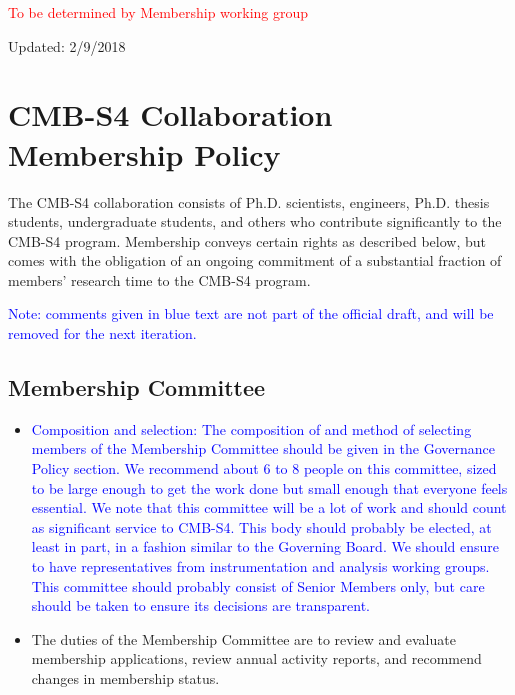 
\textcolor{red}{To be determined by Membership working group}


Updated:  2/9/2018

\section{CMB-S4 Collaboration Membership Policy}

The CMB-S4 collaboration consists of Ph.D. scientists, engineers, Ph.D. thesis students, undergraduate students, and others who contribute significantly to the CMB-S4 program. Membership conveys certain rights as described below, but comes with the obligation of an ongoing commitment of a substantial fraction of members' research time to the CMB-S4 program.

\vspace{0.2in}
\noindent
\textcolor{blue}{Note: comments given in blue text are not part of the official draft, and will be removed for the next iteration. }

\subsection{Membership Committee}
\begin{itemize}

\item 
\textcolor{blue}{Composition and selection:  The composition of and method of selecting members of the Membership Committee should be given in the Governance Policy section.  We recommend about 6 to 8 people on this committee, sized to be large enough to get the work done but small enough that everyone feels essential.  We note that this committee will be a lot of work and should count as significant service to CMB-S4.  This body should probably be elected, at least in part, in a fashion similar to the Governing Board.  We should ensure to have representatives from instrumentation and analysis working groups.  This committee should probably consist of Senior Members only, but care should be taken to ensure its decisions are transparent.}

\item The duties of the Membership Committee are to review and evaluate membership applications, review annual activity reports, and recommend changes in membership status. 
\end{itemize}

